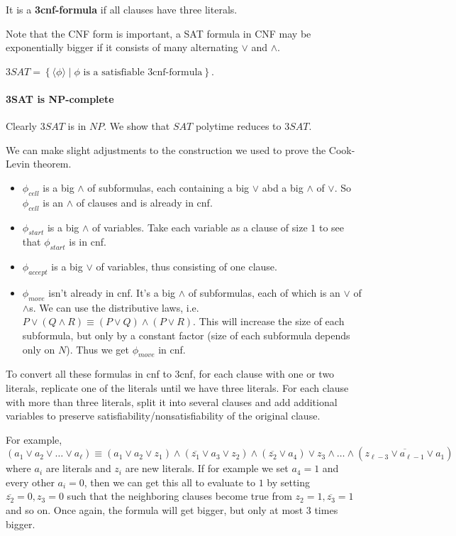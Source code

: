 \documentclass[12 pt]{article}
\begin{document}
It is a \textbf{3cnf-formula} if all clauses have three literals.

Note that the CNF form is important, a SAT formula in CNF may be
exponentially bigger if it consists of many alternating $\lor$ and
$\land$.

$3SAT = \left\{\langle \phi \rangle \mid \phi \text{ is a satisfiable
    3cnf-formula}\right\}$.
\paragraph{3SAT is NP-complete}
Clearly $3SAT$ is in $NP$. We show that $SAT$ polytime reduces to
$3SAT$.

We can make slight adjustments to the construction we used to prove
the Cook-Levin theorem.
\begin{itemize}
\item $\phi_{cell}$ is a big $\land$ of subformulas, each containing a
big $\lor$ abd a big $\land$ of $\lor$. So $\phi_{cell}$ is an $\land$
of clauses and is already in cnf.
\item $\phi_{start}$ is a big $\land$ of variables. Take each variable as
a clause of size $1$ to see that $\phi_{start}$ is in cnf.
\item $\phi_{accept}$ is a big $\lor$ of variables, thus consisting of
one clause.
\item $\phi_{move}$ isn't already in cnf. It's a big $\land$ of
  subformulas, each of which is an $\lor$ of $\land$s. We can use the
  distributive laws, i.e.\ $P \lor (Q \land R) \equiv (P \lor Q) \land
  (P \lor R)$. This will increase the size of each subformula, but
  only by a constant factor (size of each subformula depends only on
  $N$). Thus we get $\phi_{move}$ in cnf.
\end{itemize}
To convert all these formulas in cnf to 3cnf, for each clause with
one or two literals, replicate one of the literals until we have
three literals. For each clause with more than three literals, split
it into several clauses and add additional variables to preserve
satisfiability/nonsatisfiability of the original clause.

For example, $$(a_1 \lor a_2 \lor \ldots \lor a_\ell) \equiv (a_1 \lor
a_2 \lor z_1) \land (\overline{z_1} \lor a_3 \lor z_2) \land
(\overline{z_2} \lor a_4) \lor z_3 \land \ldots \land
(\overline{z_{\ell - 3} \lor a_{\ell - 1} \lor a_1})$$
where $a_i$ are literals and $z_i$ are new literals. If for example we
set $a_4 = 1$ and every other $a_i = 0$, then we can get this all to evaluate to $1$ by setting
$\overline{z_2} = 0, z_3 = 0$ such that the neighboring clauses become
true from $z_2 = 1, \overline{z_3} = 1$ and so on. Once again, the
formula will get bigger, but only at most $3$ times bigger.
\end{document}
